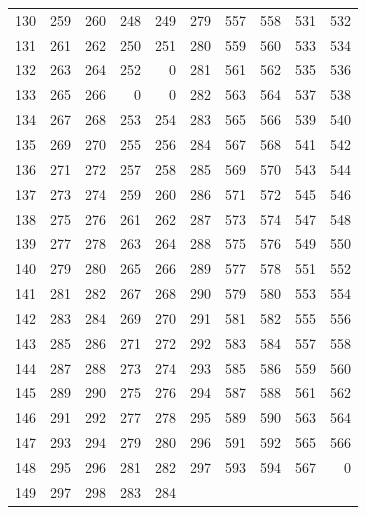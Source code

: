 \begin{longtable}{rrrrr@{\qquad}rrrrr}
130 & 259 & 260 & 248 & 249 & 279 & 557 & 558 & 531 & 532 \\
131 & 261 & 262 & 250 & 251 & 280 & 559 & 560 & 533 & 534 \\
132 & 263 & 264 & 252 & 0 & 281 & 561 & 562 & 535 & 536 \\
133 & 265 & 266 & 0 & 0 & 282 & 563 & 564 & 537 & 538 \\
134 & 267 & 268 & 253 & 254 & 283 & 565 & 566 & 539 & 540 \\
135 & 269 & 270 & 255 & 256 & 284 & 567 & 568 & 541 & 542 \\
136 & 271 & 272 & 257 & 258 & 285 & 569 & 570 & 543 & 544 \\
137 & 273 & 274 & 259 & 260 & 286 & 571 & 572 & 545 & 546 \\
138 & 275 & 276 & 261 & 262 & 287 & 573 & 574 & 547 & 548 \\
139 & 277 & 278 & 263 & 264 & 288 & 575 & 576 & 549 & 550 \\
140 & 279 & 280 & 265 & 266 & 289 & 577 & 578 & 551 & 552 \\
141 & 281 & 282 & 267 & 268 & 290 & 579 & 580 & 553 & 554 \\
142 & 283 & 284 & 269 & 270 & 291 & 581 & 582 & 555 & 556 \\
143 & 285 & 286 & 271 & 272 & 292 & 583 & 584 & 557 & 558 \\
144 & 287 & 288 & 273 & 274 & 293 & 585 & 586 & 559 & 560 \\
145 & 289 & 290 & 275 & 276 & 294 & 587 & 588 & 561 & 562 \\
146 & 291 & 292 & 277 & 278 & 295 & 589 & 590 & 563 & 564 \\
147 & 293 & 294 & 279 & 280 & 296 & 591 & 592 & 565 & 566 \\
148 & 295 & 296 & 281 & 282 & 297 & 593 & 594 & 567 & 0 \\
149 & 297 & 298 & 283 & 284 &  &  &  &  &  \\
\bottomrule\end{longtable}\normalsize
